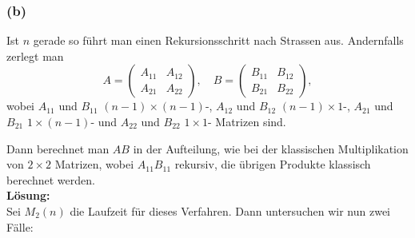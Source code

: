 \documentclass[11pt,a4paper,ngerman]{article}
\begin{document}

\subsubsection*{(b)}
Ist $n$ gerade so führt man einen Rekursionsschritt nach Strassen aus.
Andernfalls zerlegt man
$$
A = \left( \begin{array}{cc} A_{11} & A_{12}\\A_{21} & A_{22}\end{array} \right),
\quad
B = \left( \begin{array}{cc} B_{11} & B_{12}\\B_{21} & B_{22}\end{array} \right),
$$
wobei $A_{11}$ und $B_{11}$ $(n-1) \times (n-1)$-, $A_{12}$ und $B_{12}$ $(n-1)\times 1$-, $A_{21}$ und $B_{21}$ $1\times (n-1)$- und $A_{22}$ und $B_{22}$ $1 \times 1$- Matrizen sind.

Dann berechnet man $AB$ in der Aufteilung, wie bei der klassischen Multiplikation von $2\times 2$ Matrizen, wobei $A_{11}B_{11}$ rekursiv, die übrigen Produkte klassisch berechnet werden.\\

\textbf{Lösung:}\\
Sei $M_2(n)$ die Laufzeit für dieses Verfahren. Dann untersuchen wir nun zwei Fälle:
\end{document}
